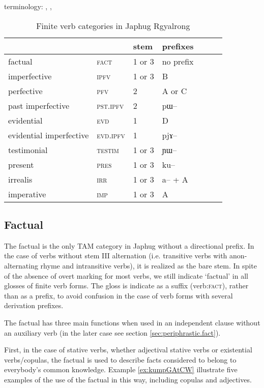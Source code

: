 \documentclass[oldfontcommands,oneside,a4paper,11pt]{article}
\newcommand{\ipa}[1]{{\phon \mbox{#1}}} %
\begin{document}
 terminology: \citet{tournadre14evidentiality},  \citet{tournadre08conjunct}, 
 

\begin{table}
\caption{Finite verb categories in Japhug Rgyalrong} \label{tab:finite.forms} \centering
\begin{tabular}{lllllll}
\toprule
&	&	stem&	prefixes\\
\midrule
factual&	\textsc{fact} &	1 or 3&	no prefix\\
imperfective&	\textsc{ipfv} &	1 or 3&	B\\
perfective&	\textsc{pfv} &	2&	A or C\\
past imperfective&	\textsc{pst.ipfv} &	2&	\ipa{pɯ--}\\
evidential&	\textsc{evd} &	1&	D\\
evidential imperfective&	\textsc{evd.ipfv} &	1&	\ipa{pjɤ--}\\
testimonial&	\textsc{testim} &	1 or 3&	\ipa{ɲɯ--}\\
present&	\textsc{pres} &	1 or 3&	\ipa{ku--}\\
irrealis&	\textsc{irr} &	1 or 3&	\ipa{a--} + A\\
imperative&	\textsc{imp} &	1 or 3&	A\\
\bottomrule
\end{tabular}
\end{table}

 

\subsection{Factual}

The factual is the only TAM category in Japhug without a directional prefix. In the case of verbs without stem III alternation (i.e. transitive verbs with anon-alternating rhyme and intransitive verbs), it is realized as the bare stem. In spite of the absence of overt marking for most verbs, we still indicate `factual' in all glosses of finite verb forms. The gloss is indicate as a suffix (verb:\textsc{fact}), rather than as a prefix, to avoid confusion in the case of verb forms with several derivation prefixes.

The factual has three main functions when used in an independent clause without an auxiliary verb (in the later case see section \ref{sec:periphrastic.fact}). 

First,  in the case of stative verbs, whether adjectival stative verbs or existential verbs/copulas, the factual is used to describe facts considered to belong to everybody's common knowledge. Example \ref{ex:kumpGAtCW} illustrate five examples of the use of the factual in this way, including copulas and adjectives. 
\end{document}
